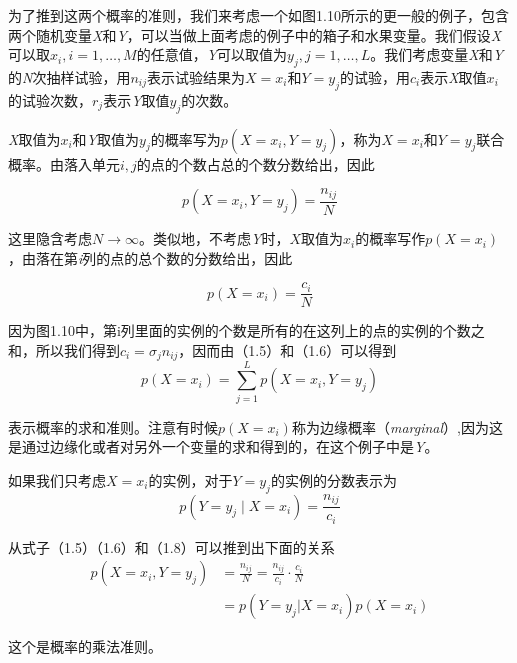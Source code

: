 	为了推到这两个概率的准则，我们来考虑一个如图1.10所示的更一般的例子，包含两个随机变量\textit{X}和\textit{Y}，可以当做上面考虑的例子中的箱子和水果变量。我们假设\textit{X}可以取$x_i, i = 1, \dots, M$的任意值，\textit{Y}可以取值为$y_j, j = 1, \dots, L$。我们考虑变量\textit{X}和\textit{Y}的\textit{N}次抽样试验，用$n_{ij}$表示试验结果为$X = x_i$和$Y = y_j$的试验，用$c_i$表示\textit{X}取值$x_i$的试验次数，$r_j$表示\textit{Y}取值$y_j$的次数。
	
	\textit{X}取值为$x_i$和\textit{Y}取值为$y_j$的概率写为$p(X = x_i, Y = y_j)$，称为$X = x_i$和$Y = y_j$联合概率。由落入单元$i,j$的点的个数占总的个数分数给出，因此
	
	\begin{equation}
	p(X = x_i, Y = y_j) = \frac{n_{ij}}{N}
	\end{equation}
	
	这里隐含考虑$N \to \infty$。类似地，不考虑\textit{Y}时，$X$取值为$x_i$的概率写作$p(X = x_i)$，由落在第\textit{i}列的点的总个数的分数给出，因此
	
	\begin{equation}
	p(X = x_i) = \frac{c_i}{N}
	\end{equation}
	
	因为图1.10中，第i列里面的实例的个数是所有的在这列上的点的实例的个数之和，所以我们得到$c_i = \sigma_j n_{ij}$，因而由（1.5）和（1.6）可以得到
	\begin{equation}
	p(X  = x_i) = \sum_{j = 1}^{L} p(X = x_i, Y = y_j)
	\end{equation}
	
	表示概率的求和准则。注意有时候$p(X = x_i)$称为边缘概率（\textit{marginal}）,因为这是通过边缘化或者对另外一个变量的求和得到的，在这个例子中是\textit{Y}。
	
	如果我们只考虑$X = x_i$的实例，对于$Y = y_j$的实例的分数表示为
	\begin{equation}
	p(Y = y_j \mid X = x_i) = \frac{n_{ij}}{c_i}
	\end{equation}
	
	从式子（1.5）（1.6）和（1.8）可以推到出下面的关系
	\begin{equation}
	\begin{aligned}
	p(X = x_i, Y = y_j) & = \frac{n_{ij}}{N} = \frac{n_{ij}}{c_i} \cdot \frac{c_i}{N}\\
	& = p(Y = y_j | X = x_i)p(X = x_i)
	\end{aligned}
	\end{equation}
	
	这个是概率的乘法准则。
	

